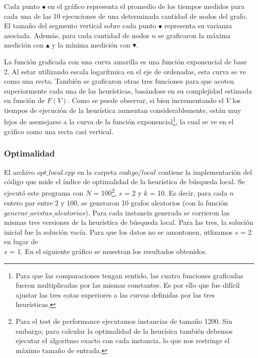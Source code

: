 \par{Cada punto $\bullet$ en el gráfico representa el promedio de los tiempos
medidos para cada una de las 10 ejecuciones de una determinada cantidad de nodos
del grafo. El tamaño del segmento vertical sobre cada punto $\bullet$ representa
su varianza asociada. Además, para cada cantidad de nodos $n$ se graficaron la
máxima medición con $\blacktriangle$ y la mínima medición con
$\blacktriangledown$.}\\

\par{La función graficada con una curva amarilla es una función exponencial de
base 2. Al estar utilizando escala logarítmica en el eje de ordenadas, esta curva
se ve como una recta. También se graficaron otras tres funciones para que acoten
superiormente cada una de las heurísticas, basándose en su complejidad estimada
en función de $F(V)$. Como se puede observar, si bien incrementando el $V$ los
tiempos de ejecución de la heurística aumentan considerablemente, están muy
lejos de asemejarse a la curva de la función exponencial\footnote{Para que
las comparaciones tengan sentido, las cuatro funciones graficadas fueron
multiplicadas por las mismas constantes. Es por ello que fue difícil ajustar
las tres cotas superiores a las curvas definidas por las tres heurísticas.},
la cual se ve en el gráfico como una recta casi vertical.}

\subsubsection{Optimalidad}

\par{El archivo $opt\_local.cpp$ en la carpeta $codigo/local$ contiene la
implementación del código que mide el índice de optimalidad de la heurística
de búsqueda local. Se ejecutó este programa con $N$ = 100\footnote{Para el test
de performance ejecutamos instancias de tamaño 1200. Sin embargo, para calcular
la optimalidad de la heurísica también debemos ejecutar el algoritmo exacto
con cada instancia, lo que nos restringe el máximo tamaño de entrada.},
$s$ = 2 y $k$ = 10. Es decir, para cada $n$ entero par entre 2 y 100, se
generaron 10 grafos aleatorios (con la función $generar\_aristas\_aleatorias$).
Para cada instancia generada se corrieron las mismas tres versiones de la
heurística de búsqueda local. Para las tres, la solución inicial fue la
solución vacía. Para que los datos no se amontonen, utlizamos $s$ = 2 en lugar
de\\$s$ = 1.
En el siguiente gráfico se muestran los resultados obtenidos.}

